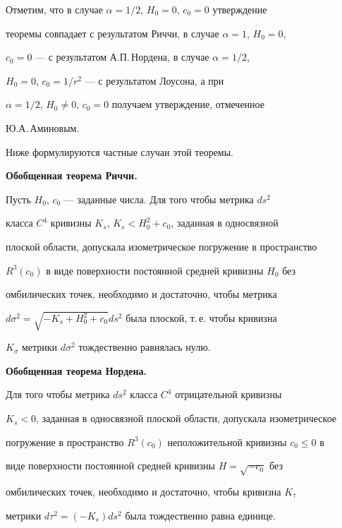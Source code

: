  


Отметим, что в случае $\alpha={1}/{2}$, $H_0=0$, $c_0=0$ утверждение 


теоремы совпадает с результатом Риччи, в случае $\alpha=1$, $H_0=0$, 


$c_0=0$ --- с результатом А.П.\,Нордена, в случае $\alpha={1}/{2}$, 


$H_0=0$, $c_0={1}/{r^2}$ --- с результатом Лоусона, а при 


$\alpha={1}/{2}$, $H_0\ne0$, $c_0=0$ получаем утверждение, отмеченное 


Ю.А.\,Аминовым. 


 


Ниже формулируются частные случаи этой теоремы. 


\medskip 


 


{\bf Обобщенная теорема Риччи.} {\it 


Пусть $H_0$, $c_0$ --- заданные числа. Для того чтобы метрика $ds^2$ 


класса $C^4$ кривизны $K_s$, $K_s<H^2_0+c_0$, заданная в односвязной 


плоской области, допускала изометрическое погружение в пространство 


$R^3(c_0)$ в виде поверхности постоянной средней кривизны $H_0$ без 


омбилических точек, необходимо и достаточно, чтобы метрика 


$d\sigma^2=\sqrt{-K_s+H^2_0+c_0}ds^2$ была плоской, т.\,е. чтобы кривизна 


$K_\sigma$ метрики $d\sigma^2$ тождественно равнялась нулю. 


} 


\medskip 


 


{\bf Обобщенная теорема Нордена.} {\it 


Для того чтобы метрика $ds^2$ класса $C^4$ отрицательной кривизны 


$K_s<0$, заданная в односвязной плоской области, допускала изометрическое 


погружение в пространство $R^3(c_0)$ неположительной кривизны $c_0\le0$ в 


виде поверхности постоянной средней кривизны $H=\sqrt{-c_0}$ без 


омбилических точек, необходимо и достаточно, чтобы кривизна $K_\tau$ 


метрики $d\tau^2=(-K_s)ds^2$ была тождественно равна единице. 


} 


